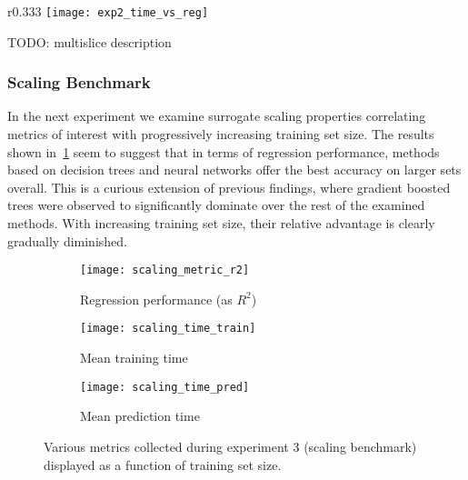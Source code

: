 \begin{wrapfigure}{r}{0.333\textwidth}
	\centering
	\vspace{-3ex}
	\texttt{[image: exp2\_time\_vs\_reg]}
	\caption{Results of experiment~2, plotted analogously
	to~\cref{fig:exp1-time-vs-reg}.}
	\label{fig:exp2-time-vs-reg}
	\vspace{-4ex}
\end{wrapfigure}

TODO: multislice description

\subsubsection{Scaling Benchmark}

In the next experiment we examine surrogate scaling properties correlating
metrics of interest with progressively increasing training set size. The results
shown in~\cref{fig:scaling} seem to suggest that in terms of regression performance,
methods based on decision trees and neural networks offer the best accuracy on
larger sets overall. This is a curious extension of previous findings, where
gradient boosted trees were observed to significantly dominate over the rest of
the examined methods. With increasing training set size, their relative advantage is
clearly gradually diminished.

\begin{figure}[h]
	\centering
	\begin{subfigure}[b]{0.333\textwidth}
		\centering
		\texttt{[image: scaling\_metric\_r2]}
		\caption{Regression performance (as $R^2$)}
	\end{subfigure}\hfill%
	\begin{subfigure}[b]{0.333\textwidth}
		\centering
		\texttt{[image: scaling\_time\_train]}
		\caption{Mean training time}
	\end{subfigure}\hfill%
	\begin{subfigure}[b]{0.333\textwidth}
		\centering
		\texttt{[image: scaling\_time\_pred]}
		\caption{Mean prediction time}
	\end{subfigure}
	\caption{Various metrics collected during experiment 3 (scaling
	benchmark) displayed as a function of training set size.}
	\label{fig:scaling}
\end{figure}

